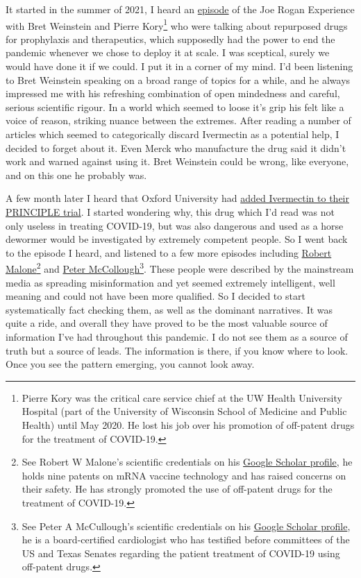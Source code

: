 \documentclass[11pt,a4paper,notitlepage]{report}
\begin{document}
It started in the summer of 2021, I heard an \href{https://open.spotify.com/episode/7uVXKgE6eLJKMXkETwcw0D?si=AwYzUSIpRsGisRkZq_qQXw}{episode} of the Joe Rogan Experience with Bret Weinstein and Pierre Kory\footnote{Pierre Kory was the critical care service chief at the UW Health University Hospital (part of the University of Wisconsin School of Medicine and Public Health) until May 2020. He lost his job over his promotion of off-patent drugs for the treatment of COVID-19.} who were talking about repurposed drugs for prophylaxis and therapeutics, which supposedly had the power to end the pandemic whenever we chose to deploy it at scale. I was sceptical, surely we would have done it if we could. I put it in a corner of my mind. I’d been listening to Bret Weinstein speaking on a broad range of topics for a while, and he always impressed me with his refreshing combination of open mindedness and careful, serious scientific rigour. In a world which seemed to loose it’s grip his felt like a voice of reason, striking nuance between the extremes. After reading a number of articles which seemed to categorically discard Ivermectin as a potential help, I decided to forget about it. Even Merck who manufacture the drug said it didn’t work and warned against using it. Bret Weinstein could be wrong, like everyone, and on this one he probably was.

A few month later I heard that Oxford University had \href{https://www.bbc.com/news/health-57570377}{added Ivermectin to their PRINCIPLE trial}. I started wondering why, this drug which I’d read was not only useless in treating COVID-19, but was also dangerous and used as a horse dewormer would be investigated by extremely competent people. So I went back to the episode I heard, and listened to a few more episodes including \href{https://open.spotify.com/playlist/0ZCLBEbktYqp1lSheZS81E?si=5ad3d9f833804821}{Robert Malone}\footnote{See Robert W Malone's scientific credentials on his \href{https://scholar.google.com/citations?user=Jf1bApYAAAAJ&hl=en}{Google Scholar profile}, he holds nine patents on mRNA vaccine technology and has raised concerns on their safety. He has strongly promoted the use of off-patent drugs for the treatment of COVID-19.} and \href{https://open.spotify.com/episode/0aZte37vtFTkYT7b0b04Qz?si=a1uycZk4RduXt09K0sHPng}{Peter McCollough}\footnote{See Peter A McCullough's scientific credentials on his \href{https://scholar.google.com/citations?hl=en&user=LzqEaOkAAAAJ}{Google Scholar profile}, he is a board-certified cardiologist who has testified before committees of the US and Texas Senates regarding the patient treatment of COVID-19 using off-patent drugs.}. These people were described by the mainstream media as spreading misinformation and yet seemed extremely intelligent, well meaning and could not have been more qualified. So I decided to start systematically fact checking them, as well as the dominant narratives. It was quite a ride, and overall they have proved to be the most valuable source of information I’ve had throughout this pandemic. I do not see them as a source of truth but a source of leads. The information is there, if you know where to look. Once you see the pattern emerging, you cannot look away. 
\end{document}
